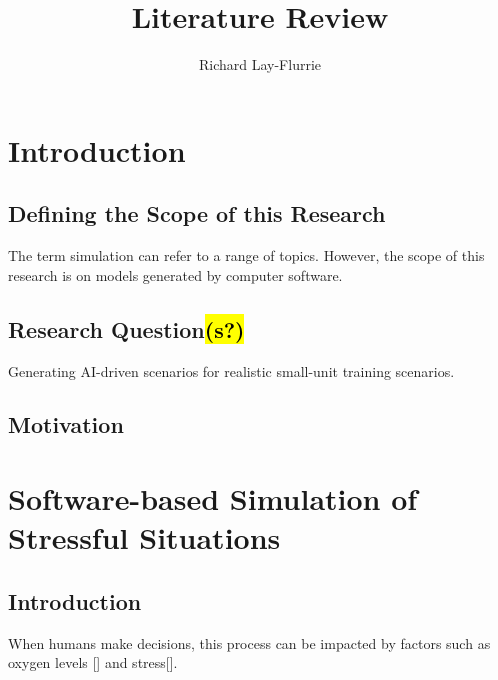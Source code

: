 \documentclass{article}
\title{Literature Review}
\author{Richard Lay-Flurrie}
\begin{document}
\maketitle

\tableofcontents



\section{Introduction}

\subsection{Defining the Scope of this Research}

The term simulation can refer to a range of topics. However, the scope of this research is on models generated by computer software.

\subsection{Research Question\hl{(s?)}}

Generating AI-driven scenarios for realistic small-unit training scenarios. 

\subsection{Motivation}

\section{Software-based Simulation of Stressful Situations}

\subsection{Introduction}

When humans make decisions, this process can be impacted by factors such as oxygen levels [] and stress[].



\end{document}
